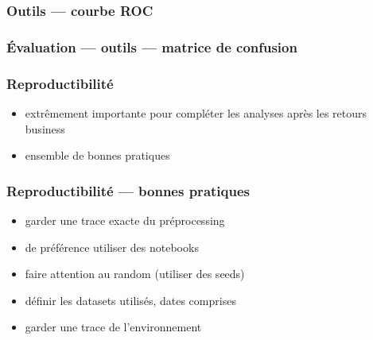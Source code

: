 \documentclass{formation}
\begin{document}
\begin{frame}
  \frametitle{Outils — courbe ROC}
\end{frame}

\begin{frame}
  \frametitle{Évaluation — outils — matrice de confusion}
\end{frame}

\begin{frame}
  \frametitle{Reproductibilité}
  \begin{itemize}
  \item extrêmement importante pour compléter les analyses après les retours business
  \item ensemble de bonnes pratiques
  \end{itemize}
\end{frame}

\begin{frame}
  \frametitle{Reproductibilité — bonnes pratiques}
  \begin{itemize}[<+->]
  \item garder une trace exacte du préprocessing
  \item de préférence utiliser des notebooks
  \item faire attention au random (utiliser des seeds)
  \item définir les datasets utilisés, dates comprises
  \item garder une trace de l'environnement
  \end{itemize}
\end{frame}
\end{document}
